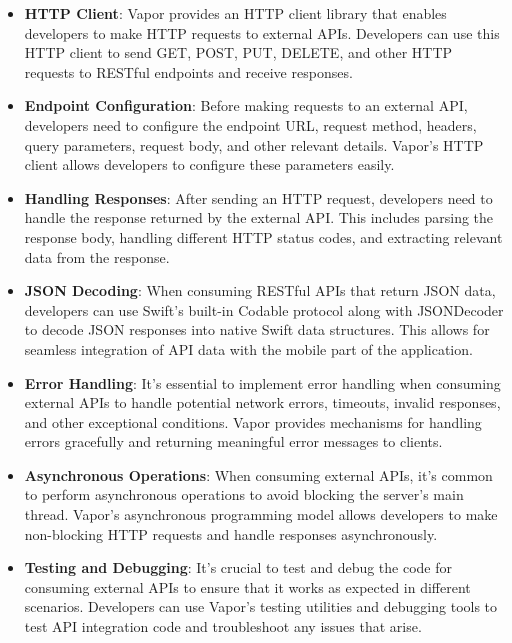 \documentclass[
  biblatex,
  language=english,
  figures=false,
  sourcecodes,
  glossaries,
  index
]{kidiplom}
\begin{document}
\begin{itemize}
    \item \textbf{HTTP Client}: Vapor provides an HTTP client library that enables developers to make HTTP requests to external APIs. Developers can use this HTTP client to send GET, POST, PUT, DELETE, and other HTTP requests to RESTful endpoints and receive responses.
    
    \item \textbf{Endpoint Configuration}: Before making requests to an external API, developers need to configure the endpoint URL, request method, headers, query parameters, request body, and other relevant details. Vapor's HTTP client allows developers to configure these parameters easily.
    
    \item \textbf{Handling Responses}: After sending an HTTP request, developers need to handle the response returned by the external API. This includes parsing the response body, handling different HTTP status codes, and extracting relevant data from the response.
    
    \item \textbf{JSON Decoding}: When consuming RESTful APIs that return JSON data, developers can use Swift's built-in Codable protocol along with JSONDecoder to decode JSON responses into native Swift data structures. This allows for seamless integration of API data with the mobile part of the application.
    
    \item \textbf{Error Handling}: It's essential to implement error handling when consuming external APIs to handle potential network errors, timeouts, invalid responses, and other exceptional conditions. Vapor provides mechanisms for handling errors gracefully and returning meaningful error messages to clients.
    
    \item \textbf{Asynchronous Operations}: When consuming external APIs, it's common to perform asynchronous operations to avoid blocking the server's main thread. Vapor's asynchronous programming model allows developers to make non-blocking HTTP requests and handle responses asynchronously.
    
    \item \textbf{Testing and Debugging}: It's crucial to test and debug the code for consuming external APIs to ensure that it works as expected in different scenarios. Developers can use Vapor's testing utilities and debugging tools to test API integration code and troubleshoot any issues that arise.
\end{itemize}
\end{document}
